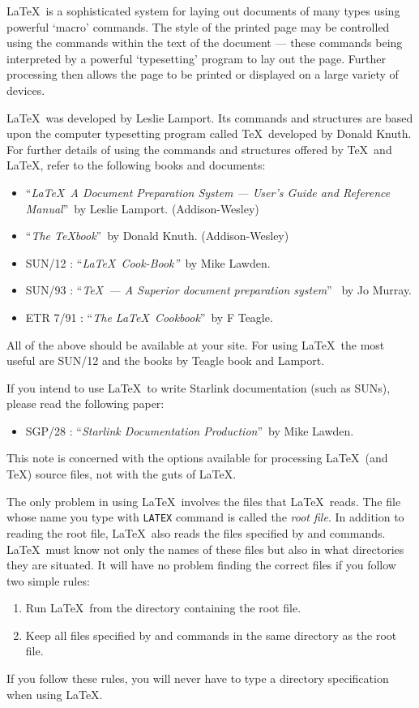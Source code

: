 \LaTeX\ is a sophisticated system for laying out documents of many types 
using powerful `macro' commands. The style of the printed page may be 
controlled using the commands within the text of the document --- these commands
being interpreted by a powerful `typesetting' program to lay out the page.
Further processing then allows the page to be printed or displayed on a large
variety of devices. 

\LaTeX\ was developed by Leslie Lamport. Its commands and structures are based
upon the computer typesetting program called \TeX\, developed by Donald Knuth.
For further details of using the commands and structures offered by \TeX\ and 
\LaTeX , refer to the following books and documents:

\begin{itemize}
\item ``{\em \LaTeX\ A Document Preparation System --- User's Guide and 
 Reference Manual\/}''~by Leslie Lamport. (Addison-Wesley)
\item ``{\em The \TeX book\/}''~by Donald Knuth. (Addison-Wesley)
\item SUN/12 : ``{\em \LaTeX\ Cook-Book''\/}~by Mike Lawden.
\item SUN/93 : ``{\em \TeX\ --- A Superior document preparation system\/}''~
 by Jo Murray.
\item ETR 7/91 : ``{\em The \LaTeX\ Cookbook\/}''~by F Teagle.
\end{itemize}

All of the above should be available at your site.
For using \LaTeX\, the most useful are SUN/12
and the books by Teagle book and Lamport.

If you intend to use \LaTeX\ to write Starlink documentation (such as SUNs), 
please read the following paper:
\begin{itemize}
\item SGP/28 : ``{\em Starlink Documentation Production\/}''~by Mike Lawden.
\end{itemize}

This note is concerned with the options available for processing \LaTeX\
(and \TeX) source files, not with the guts of \LaTeX .


The only problem in using \LaTeX\  involves the files that
\LaTeX\ reads.  The file whose name you type with \mbox{\tt LATEX}
command is called the {\em root file}.  In addition to reading the root
file, \LaTeX\ also reads the files specified by \hbox{\verb||}
and \hbox{\verb||} commands.  
\LaTeX\ must know not only the names of these files but also in what
directories they are situated.  It will have no problem finding the correct
files if you follow two simple rules:
\begin{enumerate}
 \item Run \LaTeX\ from the directory containing the root file.
 \item Keep all files specified by \hbox{\verb||} and 
      \hbox{\verb||} commands in the same directory as the root
       file.
\end{enumerate}
If you follow these rules, you will never have to type a  directory
specification when using \LaTeX.

